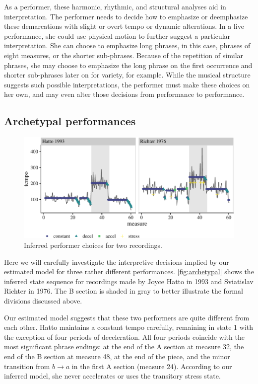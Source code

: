 \documentclass[aoas]{imsart}
\begin{document}
As a performer, these harmonic, rhythmic, and structural analyses aid
in interpretation. The performer needs to decide how to emphasize or
deemphasize these demarcations with slight or overt tempo or dynamic
alterations. In a live performance, she could use physical motion to
further suggest a particular interpretation. She can choose to
emphasize long phrases, in this 
case, phrases of eight measures, or the shorter sub-phrases. Because
of the repetition of similar phrases, she may choose to emphasize the
long phrase on the first occurrence and shorter sub-phrases later on
for variety, for example. While the musical structure suggests such
possible interpretations, the performer must make these choices on
her own, and may even alter those decisions from performance to
performance.



\subsection{Archetypal performances}
\label{sec:arch-perf}


\begin{figure}[t]
  \centering
  \includegraphics[width=.9\textwidth]{two-performances-1}
  \caption{Inferred performer choices for two recordings. }
  \label{fig:archetypal}
\end{figure}
Here we will carefully investigate the interpretive
decisions implied by our estimated model for three rather different performances. \autoref{fig:archetypal} shows the inferred state sequence for
recordings made by Joyce Hatto in 1993 and Sviatislav Richter in
1976. The B section is
shaded in gray to better illustrate the formal divisions discussed above.

Our estimated model suggests that these two performers are quite different
from each other. Hatto maintains a constant tempo carefully, remaining
in state 1 with the exception of four periods of deceleration. All
four periods coincide with the most significant phrase endings: at the
end of the A section at measure 32, the end of the B section at
measure 48, at the end of the piece, and the minor transition from
$b\rightarrow a$ in the first A section (measure 24). According
to our inferred model, she never accelerates or uses the transitory
stress state.
\end{document}

